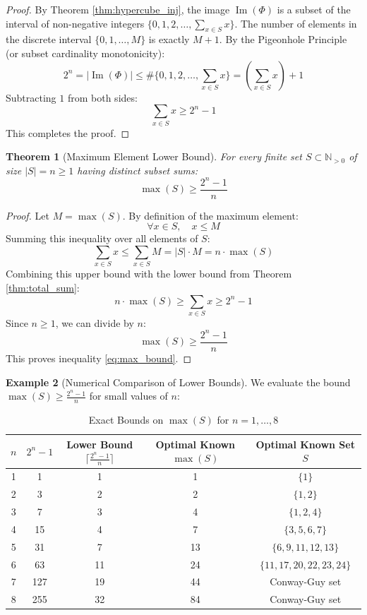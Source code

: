 \documentclass[11pt,a4paper]{article}
\newtheorem{theorem}{Theorem}[section]
\theoremstyle{definition}
\newtheorem{example}[theorem]{Example}
\begin{document}
\begin{proof}
By Theorem \ref{thm:hypercube_inj}, the image $\operatorname{Im}(\Phi)$ is a subset of the interval of non-negative integers $\{0, 1, 2, \dots, \sum_{x \in S} x\}$.
The number of elements in the discrete interval $\{0, 1, \dots, M\}$ is exactly $M + 1$.
By the Pigeonhole Principle (or subset cardinality monotonicity):
\[ 2^n = |\operatorname{Im}(\Phi)| \le \#\{0, 1, 2, \dots, \sum_{x \in S} x\} = \left(\sum_{x \in S} x\right) + 1 \]
Subtracting $1$ from both sides:
\[ \sum_{x \in S} x \ge 2^n - 1 \]
This completes the proof.
\end{proof}

\begin{theorem}[Maximum Element Lower Bound]\label{thm:max_element}
For every finite set $S \subset \mathbb{N}_{>0}$ of size $|S| = n \ge 1$ having distinct subset sums:
\begin{equation}\label{eq:max_bound}
\max(S) \ge \frac{2^n - 1}{n}
\end{equation}
\end{theorem}

\begin{proof}
Let $M = \max(S)$. By definition of the maximum element:
\[ \forall x \in S, \quad x \le M \]
Summing this inequality over all elements of $S$:
\[ \sum_{x \in S} x \le \sum_{x \in S} M = |S| \cdot M = n \cdot \max(S) \]
Combining this upper bound with the lower bound from Theorem \ref{thm:total_sum}:
\[ n \cdot \max(S) \ge \sum_{x \in S} x \ge 2^n - 1 \]
Since $n \ge 1$, we can divide by $n$:
\[ \max(S) \ge \frac{2^n - 1}{n} \]
This proves inequality \eqref{eq:max_bound}.
\end{proof}

\begin{example}[Numerical Comparison of Lower Bounds]
We evaluate the bound $\max(S) \ge \frac{2^n - 1}{n}$ for small values of $n$:
\begin{table}[ht]
\centering
\caption{Exact Bounds on $\max(S)$ for $n = 1, \dots, 8$}
\label{tab:bounds}
\vspace{0.5em}
\begin{tabular}{@{}ccccc@{}}
\toprule
$n$ & $2^n - 1$ & Lower Bound $\lceil \frac{2^n-1}{n} \rceil$ & Optimal Known $\max(S)$ & Optimal Known Set $S$ \\
\midrule
1 & 1 & 1 & 1 & $\{1\}$ \\
2 & 3 & 2 & 2 & $\{1, 2\}$ \\
3 & 7 & 3 & 4 & $\{1, 2, 4\}$ \\
4 & 15 & 4 & 7 & $\{3, 5, 6, 7\}$ \\
5 & 31 & 7 & 13 & $\{6, 9, 11, 12, 13\}$ \\
6 & 63 & 11 & 24 & $\{11, 17, 20, 22, 23, 24\}$ \\
7 & 127 & 19 & 44 & Conway-Guy set \\
8 & 255 & 32 & 84 & Conway-Guy set \\
\bottomrule
\end{tabular}
\end{table}
\end{example}
\end{document}
